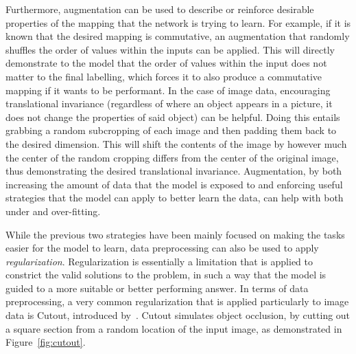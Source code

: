 Furthermore, augmentation can be used to describe or reinforce desirable properties
of the mapping that the network is trying to learn. For example, if it is known that the desired mapping is commutative,
an augmentation that randomly shuffles the order of values within the inputs can be applied. This will directly demonstrate
to the model that the order of values within the input does not matter to the final labelling, which forces it to also
produce a commutative mapping if it wants to be performant. In the case of image data, encouraging
translational invariance (regardless of where an object appears in a picture, it does not change the properties of said object) can be helpful. Doing this entails grabbing a random subcropping of
each image and then padding them back to the desired dimension. This will shift the contents of the image by however much
the center of the random cropping differs from the center of the original image, thus demonstrating the desired translational
invariance. Augmentation, by both increasing the amount
of data that the model is exposed to and enforcing useful strategies that the model can apply to better learn the data,
can help with both under and over-fitting.

While the previous two strategies have been mainly focused on making the tasks easier for the model to learn, data preprocessing can also be used
to apply \textit{regularization}. Regularization is essentially a limitation that is applied to constrict
the valid solutions to the problem, in such a way that the model is guided to a more suitable or better performing answer.
In terms of data preprocessing, a very common regularization that is applied particularly to image data is Cutout, introduced
by~\cite{devries2017}. Cutout simulates object occlusion, by
cutting out a square section from a random location of the input image, as demonstrated in Figure~\ref{fig:cutout}.

